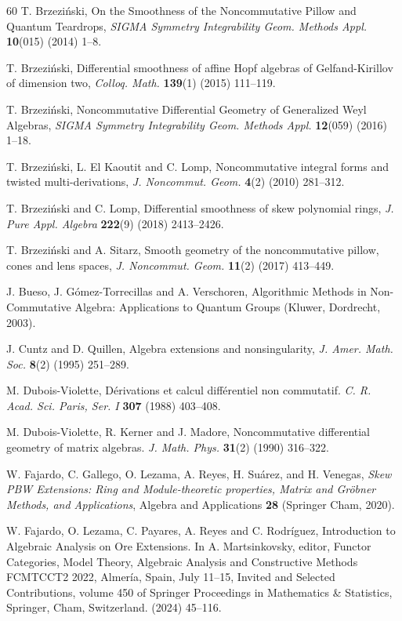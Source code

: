 \documentclass{amsart}
\theoremstyle{definition}
\theoremstyle{remark}
\numberwithin{equation}{section}
\begin{document}
\begin{thebibliography}{60}
 T. Brzezi{\'n}ski, On the Smoothness of the Noncommutative Pillow and Quantum Teardrops, {\em SIGMA Symmetry Integrability Geom. Methods Appl.} {\bf 10}(015) (2014) 1--8.

 T. Brzezi{\'n}ski, Differential smoothness of affine Hopf algebras of Gelfand-Kirillov of dimension two, {\em Colloq. Math.} {\bf 139}(1) (2015) 111--119.

T. Brzezi\'nski, Noncommutative Differential Geometry of Generalized Weyl Algebras, {\em SIGMA Symmetry Integrability Geom. Methods Appl.} {\bf 12}(059) (2016) 1--18.

 T. Brzezi{\'n}ski, L. El Kaoutit and C. Lomp, Noncommutative integral forms and twisted multi-derivations, {\em J. Noncommut. Geom.} {\bf 4}(2) (2010) 281--312.

 T. Brzezi{\'n}ski and C. Lomp, Differential smoothness of skew polynomial rings, {\em J. Pure Appl. Algebra} {\bf 222}(9) (2018) 2413--2426.

 T. Brzezi{\'n}ski and A. Sitarz, Smooth geometry of the noncommutative pillow, cones and lens spaces, {\em J. Noncommut. Geom.} {\bf 11}(2) (2017) 413--449.

 J. Bueso, J. G\'omez-Torrecillas and A. Verschoren, Algorithmic Methods in Non-Commutative Algebra: Applications to Quantum Groups (Kluwer, Dordrecht, 2003).

 J. Cuntz and D. Quillen, Algebra extensions and nonsingularity, {\em J. Amer. Math. Soc.} {\bf 8}(2) (1995) 251--289.

 M. Dubois-Violette, D\'erivations et calcul diff\'erentiel non commutatif. {\em C. R. Acad. Sci. Paris, Ser. I} {\bf 307} (1988) 403--408.

  M. Dubois-Violette, R. Kerner and J. Madore, Noncommutative differential geometry of matrix algebras. {\em J. Math. Phys.} {\bf 31}(2) (1990) 316--322.

 W. Fajardo, C. Gallego, O.  Lezama, A. Reyes, H. Su\'arez, and H. Venegas, {\em Skew PBW Extensions: Ring and Module-theoretic properties, Matrix and Gr\"obner Methods, and Applications}, Algebra and Applications {\bf 28} (Springer Cham, 2020).

 W. Fajardo, O. Lezama, C. Payares, A. Reyes and C. Rodr\'iguez, Introduction to Algebraic Analysis on Ore Extensions. In A. Martsinkovsky, editor, Functor Categories, Model Theory, Algebraic Analysis and Constructive Methods FCMTCCT2 2022, Almer\'ia, Spain, July 11--15, Invited and Selected Contributions, volume 450 of Springer Proceedings in Mathematics \& Statistics, Springer, Cham, Switzerland. (2024) 45--116.


\end{thebibliography}
\end{document}
